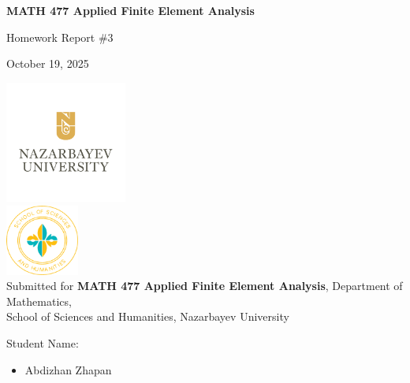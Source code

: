 \documentclass[12pt,a4paper]{article}
\begin{document}
\begin{titlepage}
  \centering
  \vspace*{0.5cm}
  {\Large\bfseries MATH 477 Applied Finite Element Analysis\par}
  \vspace{1cm}
  {\large Homework Report \#3\par}
  \vspace{0.5cm}
  {October 19, 2025\par}
  \vspace{0.7cm}
  \includegraphics[width=0.3\textwidth]{NU-logo.png}\\[0.3cm]
  \includegraphics[width=0.18\textwidth]{sosah-logo.png}\\[0.3cm]
  \vspace{0.3cm}
  Submitted for {\bf MATH 477 Applied Finite Element Analysis}, Department of Mathematics,\\
  School of Sciences and Humanities, Nazarbayev University

  \vspace{0.6cm}
  {\large Student Name:\par}
  \begin{itemize}[leftmargin=6cm]
    \item Abdizhan Zhapan
  \end{itemize}
  \vspace{0.5cm}
\end{titlepage}
\end{document}

